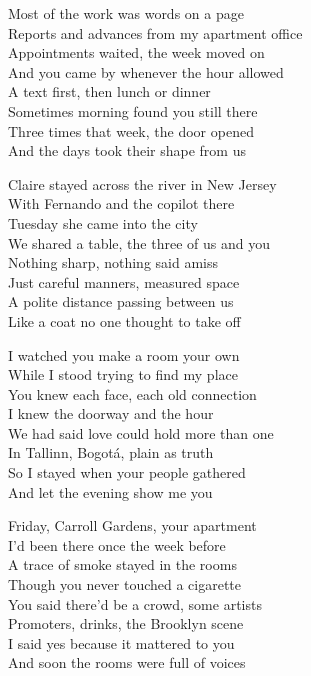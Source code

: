 \begin{lyrics}
Most of the work was words on a page\\
Reports and advances from my apartment office\\
Appointments waited, the week moved on\\
And you came by whenever the hour allowed\\
A text first, then lunch or dinner\\
Sometimes morning found you still there\\
Three times that week, the door opened\\
And the days took their shape from us

Claire stayed across the river in New Jersey\\
With Fernando and the copilot there\\
Tuesday she came into the city\\
We shared a table, the three of us and you\\
Nothing sharp, nothing said amiss\\
Just careful manners, measured space\\
A polite distance passing between us\\
Like a coat no one thought to take off

I watched you make a room your own\\
While I stood trying to find my place\\
You knew each face, each old connection\\
I knew the doorway and the hour\\
We had said love could hold more than one\\
In Tallinn, Bogotá, plain as truth\\
So I stayed when your people gathered\\
And let the evening show me you

Friday, Carroll Gardens, your apartment\\
I’d been there once the week before\\
A trace of smoke stayed in the rooms\\
Though you never touched a cigarette\\
You said there’d be a crowd, some artists\\
Promoters, drinks, the Brooklyn scene\\
I said yes because it mattered to you\\
And soon the rooms were full of voices


\end{lyrics}
